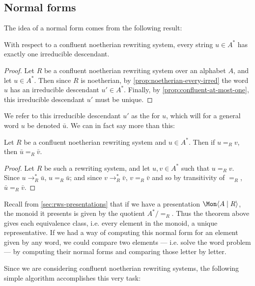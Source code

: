 \documentclass[showlabels,noindex,12pt]{lmaths}
\begin{document}
\subsection{Normal forms} \label{sec:normal-forms}

The idea of a normal form comes from the following result:

\begin{prop}
	With respect to a confluent noetherian rewriting system, every string $u \in A^*$ has exactly one irreducible descendant.
\end{prop}
\begin{proof}
	Let $R$ be a confluent noetherian rewriting system over an alphabet $A$, and let $u \in A^*$. Then since $R$ is noetherian, by \cref{prop:noetherian-every-irred} the word $u$ has an irreducible descendant $u' \in A^*$. Finally, by \cref{prop:confluent-at-most-one}, this irreducible descendant $u'$ must be unique.
\end{proof}

We refer to this irreducible descendant $u'$ as the  for $u$, which will for a general word $u$ be denoted $\bar u$. We can in fact say more than this:

\begin{theorem}
	Let $R$ be a confluent noetherian rewriting system and $u \in A^*$. Then if $u =_R v$, then $\bar u =_R \bar v$.
\end{theorem}
\begin{proof}
	Let $R$ be such a rewriting system, and let $u, v \in A^*$ such that $u =_R v$. Since $u \to_R^* \bar u$, $u =_R \bar u$; and since $v \to_R^* \bar v$, $v =_R \bar v$ and so by transitivity of $=_R$, $\bar u =_R \bar v$.
\end{proof}

Recall from \cref{sec:rws-presentations} that if we have a presentation $\Mon \langle A \mid R \rangle$, the monoid it presents is given by the quotient $A^*/{=_R}$. Thus the theorem above gives each equivalence class, i.e. every element in the monoid, a unique representative. If we had a way of computing this normal form for an element given by any word, we could compare two elements --- i.e. solve the word problem --- by computing their normal forms and comparing those letter by letter.

Since we are considering confluent noetherian rewriting systems, the following simple algorithm accomplishes this very task:
\end{document}

